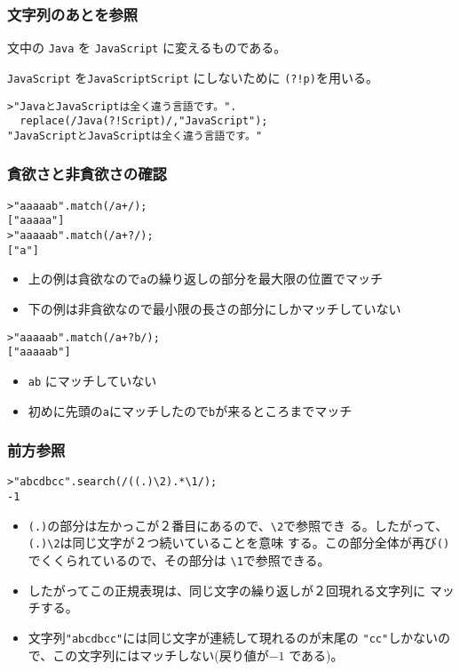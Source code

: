 \begin{frame}[containsverbatim]
 \frametitle{文字列のあとを参照}
文中の \Verb+Java+ を \Verb+JavaScript+ に変えるものである。

\Verb+JavaScript+ を{\color{red}\Verb+JavaScriptScript+} にしないために
\Verb+(?!p)+を用いる。
\begin{Verbatim}
>"JavaとJavaScriptは全く違う言語です。".
  replace(/Java(?!Script)/,"JavaScript");
"JavaScriptとJavaScriptは全く違う言語です。"
\end{Verbatim}
\end{frame}
\begin{frame}[containsverbatim]
 \frametitle{貪欲さと非貪欲さの確認}
\begin{Verbatim}
>"aaaaab".match(/a+/);
["aaaaa"]
>"aaaaab".match(/a+?/);
["a"]
\end{Verbatim}
\begin{itemize}
 \item 上の例は貪欲なので\Verb+a+の繰り返しの部分を最大限の位置でマッチ
 \item 下の例は非貪欲なので最小限の長さの部分にしかマッチしていない
\end{itemize}
\begin{Verbatim}
>"aaaaab".match(/a+?b/);
["aaaaab"]
\end{Verbatim}
\begin{itemize}
 \item \Verb+ab+ にマッチしていない
 \item 初めに先頭の\Verb+a+にマッチしたので\Verb+b+が来るところまでマッチ
\end{itemize}

\end{frame}
\begin{frame}[containsverbatim]
 \frametitle{前方参照}
\begin{Verbatim}
>"abcdbcc".search(/((.)\2).*\1/);
-1
\end{Verbatim}
\begin{itemize}
 \item \Verb+(.)+の部分は左かっこが２番目にあるので、\Verb+\2+で参照でき
       る。したがって、\Verb+(.)\2+は同じ文字が２つ続いていることを意味
       する。この部分全体が再び\Verb+()+でくくられているので、その部分は
       \Verb+\1+で参照できる。
 \item したがってこの正規表現は、同じ文字の繰り返しが２回現れる文字列に
       マッチする。
 \item 文字列\Verb+"abcdbcc"+には同じ文字が連続して現れるのが末尾の
       \Verb+"cc"+しかないので、この文字列にはマッチしない(戻り値が$-1$
       である)。
\end{itemize}
\end{frame}
